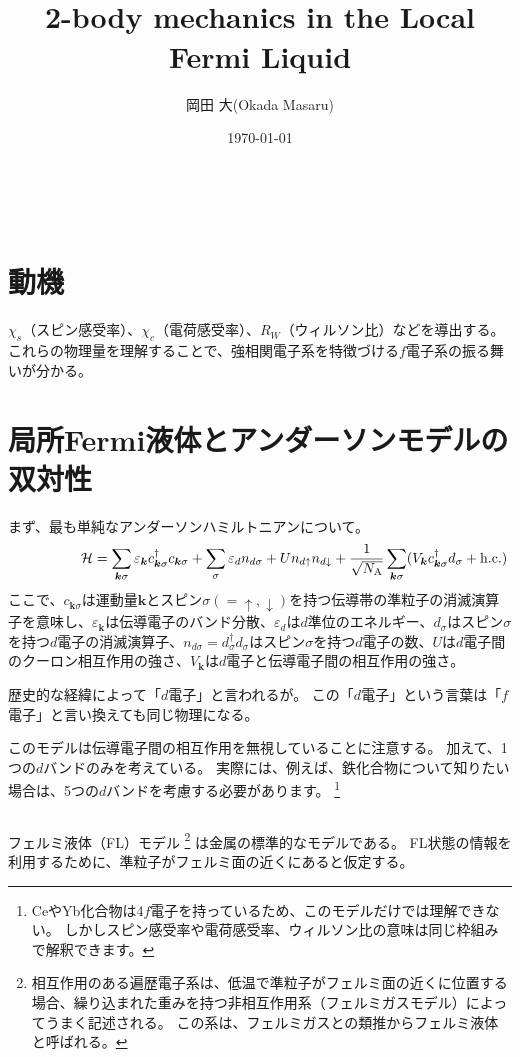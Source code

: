 \documentclass[a4j]{jarticle}
\title{\ \\[-35mm] 2-body mechanics in the Local Fermi Liquid
}
\author{ 岡田 大(Okada Masaru)}
\date{\today}
\begin{document}
\allowdisplaybreaks
\maketitle

\ \\[-20mm]

\section*{動機}


$\chi_{s}$（スピン感受率）、$\chi_{c}$（電荷感受率）、$R_{W}$（ウィルソン比）などを導出する。
これらの物理量を理解することで、強相関電子系を特徴づける$f$電子系の振る舞いが分かる。


\section*{局所Fermi液体とアンダーソンモデルの双対性}
まず、最も単純なアンダーソンハミルトニアンについて。
\begin{align}
	\hspace{17.3mm}
	\mathcal{H}
	=
	\sum_{\bm{k}\sigma}
	\varepsilon_{\bm{k}}
	c^{\dagger}_{\bm{k} \sigma}
	c_{\bm{k} \sigma}
	+
	\sum_{\sigma}
	\varepsilon_{d}
	n_{d \sigma}
	+
	U
	n_{d \uparrow}
	n_{d \downarrow}
	+
	\frac{1}{\sqrt{N_{\rm A}}}
	\sum_{\bm{k}\sigma}
	(
	V_{\bm{k}}
	c_{\bm{k}\sigma}^{\dagger}
	d_{\sigma}
	+
	{\rm h.c.}
	)
\end{align}
ここで、$c_{\bm{k}\sigma}$は運動量$\bm{k}$とスピン$\sigma(=\uparrow,\downarrow)$を持つ伝導帯の準粒子の消滅演算子を意味し、$\varepsilon_{\bm{k}}$は伝導電子のバンド分散、$\varepsilon_{d}$は$d$準位のエネルギー、$d_{\sigma}$はスピン$\sigma$を持つ$d$電子の消滅演算子、$n_{d \sigma}=d_{\sigma}^{\dagger} d_{\sigma}$はスピン$\sigma$を持つ$d$電子の数、$U$は$d$電子間のクーロン相互作用の強さ、$V_{\bm{k}}$は$d$電子と伝導電子間の相互作用の強さ。

歴史的な経緯によって「$d$電子」と言われるが。
この「$d$電子」という言葉は「$f$電子」と言い換えても同じ物理になる。

このモデルは伝導電子間の相互作用を無視していることに注意する。
加えて、1つの$d$バンドのみを考えている。
実際には、例えば、鉄化合物について知りたい場合は、5つの$d$バンドを考慮する必要があります。
\footnote{
	CeやYb化合物は4$f$電子を持っているため、このモデルだけでは理解できない。
	しかしスピン感受率や電荷感受率、ウィルソン比の意味は同じ枠組みで解釈できます。
}

${}$

フェルミ液体（FL）モデル
\footnote{
	相互作用のある遍歴電子系は、低温で準粒子がフェルミ面の近くに位置する場合、繰り込まれた重みを持つ非相互作用系（フェルミガスモデル）によってうまく記述される。
	この系は、フェルミガスとの類推からフェルミ液体と呼ばれる。
}
は金属の標準的なモデルである。
FL状態の情報を利用するために、準粒子がフェルミ面の近くにあると仮定する。
\end{document}
